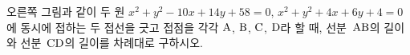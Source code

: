 \noindent\begin{minipage}[t]{0.58\linewidth}\vspace{0pt}\raggedright 오른쪽 그림과 같이 두 원 $x^2+y^2-10x+14y+58=0$, $x^2+y^2+4x+6y+4=0$에 동시에 접하는 두 접선을 긋고 접점을 각각 $\mathrm{A}$, $\mathrm{B}$, $\mathrm{C}$, $\mathrm{D}$라 할 때, 선분~$\mathrm{AB}$의 길이와 선분~$\mathrm{CD}$의 길이를 차례대로 구하시오.\end{minipage}\hfill\begin{minipage}[t]{0.4\linewidth}\vspace{0pt}\centering \resizebox{\ifdim\width>\linewidth\linewidth\else\width\fi}{!}{}\end{minipage}\par
